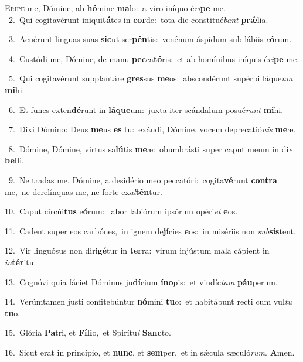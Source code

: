 \lettrine{\initial\textcolor{\initialcolor}{E}}{ripe} me, Dómine, ab \textbf{hó}\-mine \textbf{ma}\-lo:~\star a viro iníquo é\-\textit{ri}\-\textbf{pe} me.\\
{\numbfont\textcolor{\numbcolor}{~2.}}~Qui cogitavérunt iniqui\-\textbf{tá}\-tes in \textbf{cor}\-de:~\star tota die constitué\textit{bant} \textbf{prǽ}\-lia.\par
{\numbfont\textcolor{\numbcolor}{~3.}}~Acuérunt linguas suas \textbf{sic}\-ut ser\-\textbf{pén}\-tis:~\star venénum áspidum sub lábiis \textit{e}\-\textbf{ó}rum.\par
{\numbfont\textcolor{\numbcolor}{~4.}}~Custódi me, Dómine, de manu \textbf{pec}\-ca\-\textbf{tó}\-ris:~\star et ab homínibus iníquis é\-\textit{ri}\-\textbf{pe} me.\par
{\numbfont\textcolor{\numbcolor}{~5.}}~Qui cogitavérunt supplantáre \textbf{gres}\-sus \textbf{me}\-os:~\star abscondérunt supérbi láque\textit{um} \textbf{mi}\-hi:\par
{\numbfont\textcolor{\numbcolor}{~6.}}~Et funes exten\-\textbf{dé}\-runt in \textbf{lá}\-\textbf{que}um:~\star juxta iter scándalum posué\textit{runt} \textbf{mi}\-hi.\par
{\numbfont\textcolor{\numbcolor}{~7.}}~Dixi Dómino: Deus \textbf{me}\-us \textbf{es} tu:~\star exáudi, Dómine, vocem deprecatió\textit{nis} \textbf{me}\-æ.\par
{\numbfont\textcolor{\numbcolor}{~8.}}~Dómine, Dómine, virtus sa\-\textbf{lú}\-tis \textbf{me}\-æ:~\star obumbrásti super caput meum in di\textit{e} \textbf{bel}\-li.\par
{\numbfont\textcolor{\numbcolor}{~9.}}~Ne tradas me, Dómine, a desidério meo peccatóri:~\dagger cogita\-\textbf{vé}\-runt \textbf{con}\-\textbf{tra} me,~\star ne derelínquas me, ne forte ex\-\textit{al}\-\textbf{tén}tur.\par
{\numbfont\textcolor{\numbcolor}{10.}}~Caput circúi\textbf{tus} e\-\textbf{ó}\-rum:~\star labor labiórum ipsórum opéri\textit{et} \textbf{e}\-os.\par
{\numbfont\textcolor{\numbcolor}{11.}}~Cadent super eos carbónes,~\dagger in ignem de\-\textbf{jí}\-cies \textbf{e}\-os:~\star in misériis non \textit{sub}\-\textbf{sís}tent.\par
{\numbfont\textcolor{\numbcolor}{12.}}~Vir linguósus non diri\-\textbf{gé}\-tur in \textbf{ter}\-ra:~\star virum injústum mala cápient in \textit{in}\-\textbf{tér}itu.\par
{\numbfont\textcolor{\numbcolor}{13.}}~Cognóvi quia fáciet Dóminus ju\-\textbf{dí}\-cium \textbf{ín}\-\textbf{o}pis:~\star et vindíc\textit{tam} \textbf{páu}\-perum.\par
{\numbfont\textcolor{\numbcolor}{14.}}~Verúmtamen justi confitebúntur \textbf{nó}\-mini \textbf{tu}\-o:~\star et habitábunt recti cum vul\textit{tu} \textbf{tu}\-o.\par
{\numbfont\textcolor{\numbcolor}{15.}}~Glória \textbf{Pa}\-tri, et \textbf{Fí}\-\textbf{li}o,~\star et Spirítu\textit{i} \textbf{Sanc}\-to.\par
{\numbfont\textcolor{\numbcolor}{16.}}~Sicut erat in princípio, et \textbf{nunc}\-, et \textbf{sem}\-per,~\star et in sǽcula sæculó\-\textit{rum}\-. \textbf{A}\-men.\par
